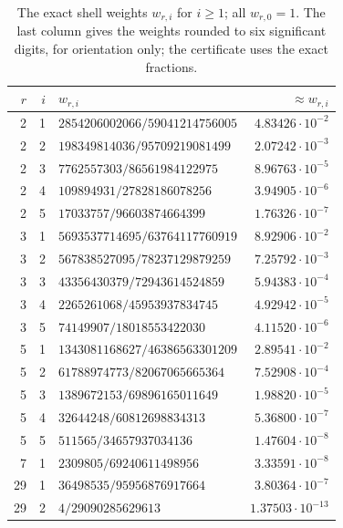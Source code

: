 \begin{table}[htbp]
\centering\small
\caption{The exact shell weights $w_{r,i}$ for $i\ge1$; all $w_{r,0}=1$.
The last column gives the weights rounded to six significant digits,
for orientation only; the certificate uses the exact fractions.}
\label{cert:tab-weights}
\begin{tabular}{rrlr}
\toprule
$r$ & $i$ & $w_{r,i}$ & $\approx w_{r,i}$\\
\midrule
2 & 1 & $2854206002066/59041214756005$ & $4.83426\cdot10^{-2}$\\
2 & 2 & $198349814036/95709219081499$ & $2.07242\cdot10^{-3}$\\
2 & 3 & $7762557303/86561984122975$ & $8.96763\cdot10^{-5}$\\
2 & 4 & $109894931/27828186078256$ & $3.94905\cdot10^{-6}$\\
2 & 5 & $17033757/96603874664399$ & $1.76326\cdot10^{-7}$\\
\midrule
3 & 1 & $5693537714695/63764117760919$ & $8.92906\cdot10^{-2}$\\
3 & 2 & $567838527095/78237129879259$ & $7.25792\cdot10^{-3}$\\
3 & 3 & $43356430379/72943614524859$ & $5.94383\cdot10^{-4}$\\
3 & 4 & $2265261068/45953937834745$ & $4.92942\cdot10^{-5}$\\
3 & 5 & $74149907/18018553422030$ & $4.11520\cdot10^{-6}$\\
\midrule
5 & 1 & $1343081168627/46386563301209$ & $2.89541\cdot10^{-2}$\\
5 & 2 & $61788974773/82067065665364$ & $7.52908\cdot10^{-4}$\\
5 & 3 & $1389672153/69896165011649$ & $1.98820\cdot10^{-5}$\\
5 & 4 & $32644248/60812698834313$ & $5.36800\cdot10^{-7}$\\
5 & 5 & $511565/34657937034136$ & $1.47604\cdot10^{-8}$\\
\midrule
7 & 1 & $2309805/69240611498956$ & $3.33591\cdot10^{-8}$\\
\midrule
29 & 1 & $36498535/95956876917664$ & $3.80364\cdot10^{-7}$\\
29 & 2 & $4/29090285629613$ & $1.37503\cdot10^{-13}$\\
\bottomrule
\end{tabular}
\end{table}
